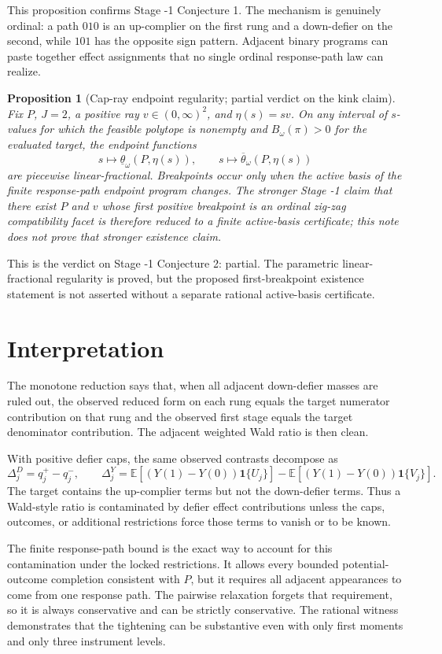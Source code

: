 \documentclass[11pt]{article}
\newcommand{\E}{\mathbb{E}}
\newcommand{\one}{\mathbf{1}}
\theoremstyle{definition}
\theoremstyle{plain}
\newtheorem{proposition}{Proposition}
\theoremstyle{remark}
\begin{document}
This proposition confirms Stage -1 Conjecture 1.  The mechanism is genuinely
ordinal: a path \(010\) is an up-complier on the first rung and a down-defier
on the second, while \(101\) has the opposite sign pattern.  Adjacent binary
programs can paste together effect assignments that no single ordinal
response-path law can realize.

\begin{proposition}[Cap-ray endpoint regularity; partial verdict on the kink claim]\label{prop:kink-partial}
Fix \(P\), \(J=2\), a positive ray \(v\in(0,\infty)^2\), and
\(\eta(s)=s v\).  On any interval of \(s\)-values for which the feasible
polytope is nonempty and \(B_\omega(\pi)>0\) for the evaluated target, the
endpoint functions
\[
s\mapsto \underline\theta_\omega(P,\eta(s)),
\qquad
s\mapsto \overline\theta_\omega(P,\eta(s))
\]
are piecewise linear-fractional.  Breakpoints occur only when the active basis
of the finite response-path endpoint program changes.  The stronger Stage -1
claim that there exist \(P\) and \(v\) whose first positive breakpoint is an
ordinal zig-zag compatibility facet is therefore reduced to a finite
active-basis certificate; this note does not prove that stronger existence
claim.
\end{proposition}

This is the verdict on Stage -1 Conjecture 2: partial.  The parametric
linear-fractional regularity is proved, but the proposed first-breakpoint
existence statement is not asserted without a separate rational active-basis
certificate.

\section{Interpretation}
The monotone reduction says that, when all adjacent down-defier masses are
ruled out, the observed reduced form on each rung equals the target numerator
contribution on that rung and the observed first stage equals the target
denominator contribution.  The adjacent weighted Wald ratio is then clean.

With positive defier caps, the same observed contrasts decompose as
\[
\Delta^D_j=q_j^+-q_j^-,
\qquad
\Delta^Y_j
=\E[(Y(1)-Y(0))\one\{U_j\}]
-\E[(Y(1)-Y(0))\one\{V_j\}].
\]
The target contains the up-complier terms but not the down-defier terms.
Thus a Wald-style ratio is contaminated by defier effect contributions unless
the caps, outcomes, or additional restrictions force those terms to vanish or
to be known.

The finite response-path bound is the exact way to account for this
contamination under the locked restrictions.  It allows every bounded
potential-outcome completion consistent with \(P\), but it requires all
adjacent appearances to come from one response path.  The pairwise relaxation
forgets that requirement, so it is always conservative and can be strictly
conservative.  The rational witness demonstrates that the tightening can be
substantive even with only first moments and only three instrument levels.
\end{document}
